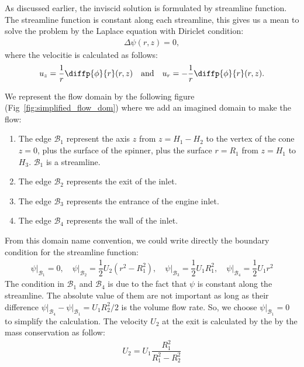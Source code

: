 \documentclass[12pt]{book}
\theoremstyle{bfnote}
\theoremstyle{bfnote}
\begin{document}
As discussed earlier, the inviscid solution is formulated by streamline function. The streamline function is constant along each streamline, this gives us a mean to solve the problem by the Laplace equation with Diriclet condition:
\begin{align}
    \Delta \psi(r, z) = 0,
\end{align}
where the velocitie is calculated as follows:
\begin{align}
    u_z = \dfrac{1}{r} \diffp{\phi}{r}(r,z) \quad \text{and} \quad u_r = - \dfrac{1}{r} \diffp{\phi}{r}(r, z).
\end{align}

We represent the flow domain by the following figure (Fig~\ref{fig:simplified_flow_dom}) where we add an imagined domain to make the flow:
\begin{enumerate}
    \item The edge $\mathscr{B}_1$ represent the axis $z$ from $z = H_1 - H_2$ to the vertex of the cone $z = 0$, plus the surface of the spinner, plus the surface $r = R_1$ from $z = H_1$ to $H_3$. $\mathscr{B}_1$ is a streamline.
    \item The edge $\mathscr{B}_2$ represents the exit of the inlet.
    \item The edge $\mathscr{B}_3$ represents the entrance of the engine inlet.
    \item The edge $\mathscr{B}_4$ represents the wall of the inlet.
\end{enumerate}

From this domain name convention, we could write directly the boundary condition for the streamline function:
\begin{align}
    \left. \psi \right|_{\mathscr{B}_1} = 0, \quad \left. \psi \right|_{\mathscr{B}_2} = \dfrac{1}{2} U_2 \left( r^2 - R_1^2 \right), \quad \left. \psi \right|_{\mathscr{B}_3} = \dfrac{1}{2} U_1 R_1^2, \quad \left. \psi \right|_{\mathscr{B}_4} = \dfrac{1}{2} U_1 r^2
\end{align}
The condition in $\mathscr{B}_1$ and $\mathscr{B}_4$ is due to the fact that $\psi$ is constant along the streamline. The absolute value of them are not important as long as their difference $\left. \psi \right|_{\mathscr{B}_4} - \left. \psi \right|_{\mathscr{B}_1} = U_1 R_2^2/2$ is the volume flow rate. So, we choose $\left. \psi \right|_{\mathscr{B}_1} = 0$ to simplify the calculation. The velocity $U_2$ at the exit is calculated by the by the mass conservation as follow:
\begin{align}
    U_2 = U_1 \dfrac{R_1^2}{R_1^2 - R_2^2}
\end{align}
\end{document}
